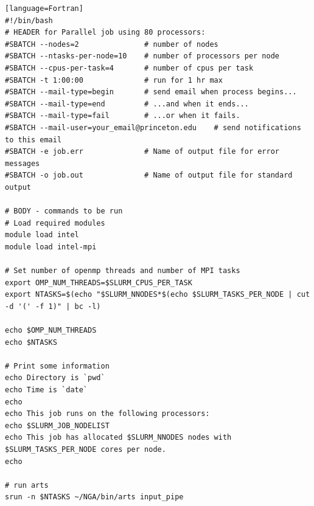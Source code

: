 \documentclass{homework}
\begin{document}
\begin{verbatim}[language=Fortran]
#!/bin/bash
# HEADER for Parallel job using 80 processors:
#SBATCH --nodes=2               # number of nodes
#SBATCH --ntasks-per-node=10    # number of processors per node
#SBATCH --cpus-per-task=4       # number of cpus per task
#SBATCH -t 1:00:00              # run for 1 hr max
#SBATCH --mail-type=begin       # send email when process begins...
#SBATCH --mail-type=end         # ...and when it ends...
#SBATCH --mail-type=fail        # ...or when it fails.
#SBATCH --mail-user=your_email@princeton.edu    # send notifications to this email
#SBATCH -e job.err              # Name of output file for error messages
#SBATCH -o job.out              # Name of output file for standard output

# BODY - commands to be run
# Load required modules
module load intel               
module load intel-mpi

# Set number of openmp threads and number of MPI tasks
export OMP_NUM_THREADS=$SLURM_CPUS_PER_TASK
export NTASKS=$(echo "$SLURM_NNODES*$(echo $SLURM_TASKS_PER_NODE | cut -d '(' -f 1)" | bc -l)

echo $OMP_NUM_THREADS
echo $NTASKS

# Print some information
echo Directory is `pwd`
echo Time is `date`
echo
echo This job runs on the following processors:
echo $SLURM_JOB_NODELIST
echo This job has allocated $SLURM_NNODES nodes with $SLURM_TASKS_PER_NODE cores per node.
echo

# run arts
srun -n $NTASKS ~/NGA/bin/arts input_pipe
\end{verbatim}
\end{document}
